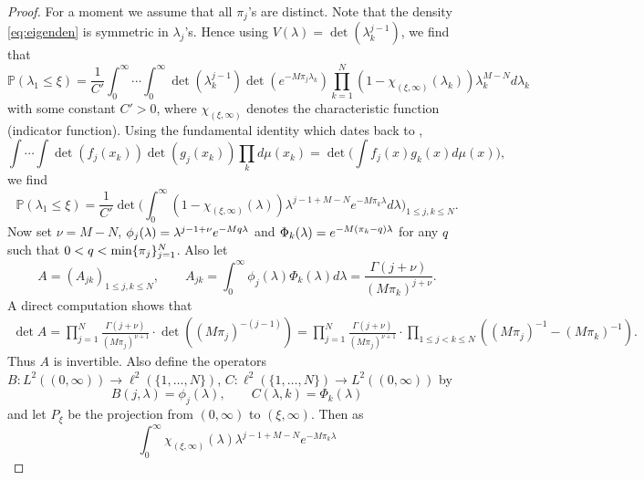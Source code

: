 \documentclass[11pt]{article}
\begin{document}
\begin{proof}
For a moment we assume that all $\pi_j$'s are distinct. Note that
the density \eqref{eq:eigenden} is symmetric in $\lambda_j$'s.
Hence using $V(\lambda)=\det(\lambda_k^{j-1})$, we find that
\begin{equation}
  \mathbb{P}(\lambda_1\le \xi)
  = \frac1{C'} \int_0^\infty \cdots \int_0^\infty
  \det(\lambda_k^{j-1})
  \det(e^{-M\pi_j \lambda_k})  \prod_{k=1}^N
  (1-\chi_{(\xi,\infty)}(\lambda_k))\lambda_k^{M-N} d\lambda_k
\end{equation}
with some constant $C'>0$, where $\chi_{(\xi,\infty)}$ denotes the
characteristic function (indicator function). Using the
fundamental identity which dates back to \cite{Andreief},
\begin{equation}
  \int\cdots \int \det(f_j(x_k)) \det(g_j(x_k)) \prod_k d\mu(x_k)
  = \det \biggl( \int f_j(x)g_k(x) d\mu(x) \biggr),
\end{equation}
we find
\begin{equation}
  \mathbb{P} (\lambda_1\le \xi)
  = \frac1{C'} \det \biggl(
  \int_0^\infty (1-\chi_{(\xi,\infty)}(\lambda)) \lambda^{j-1+M-N} e^{-M\pi_k \lambda}
  d\lambda
  \biggr)_{1\le j,k\le N} .
\end{equation}
Now set $\nu=M-N$,
$\phi_j(\lambda)=\lambda^{j-1+\nu}e^{-Mq\lambda}$ and
$\Phi_k(\lambda)=e^{-M(\pi_k-q) \lambda}$ for any $q$
such that $0<q<\min\{\pi_j\}_{j=1}^N$. Also let
\begin{equation}
  A=(A_{jk})_{1\le j,k\le N}, \qquad A_{jk} = \int_0^{\infty} \phi_j(\lambda)
  \Phi_k(\lambda)
  d\lambda
  = \frac{\Gamma(j+\nu)}{(M\pi_k)^{j+\nu}}.
\end{equation}
A direct computation shows that
\begin{eqnarray}\label{eq:detA}
 \det A
 = \prod_{j=1}^N \frac{\Gamma(j+\nu)}{(M\pi_j)^{\nu+1}}
 \cdot \det((M\pi_j)^{-(j-1)})
 = \prod_{j=1}^N \frac{\Gamma(j+\nu)}{(M\pi_j)^{\nu+1}}
 \cdot \prod_{1\le j<k\le N} ((M\pi_j)^{-1}-(M\pi_k)^{-1}).
\end{eqnarray}
Thus $A$ is invertible. Also define the operators
$B:L^2((0,\infty))\to \ell^2(\{1,\dots, N\})$, $C:
\ell^2(\{1,\dots, N\}) \to L^2((0,\infty))$ by
\begin{equation}
  B(j,\lambda) = \phi_j(\lambda), \qquad C(\lambda, k) =
  \Phi_k(\lambda)
\end{equation}
and let $P_\xi$ be the projection from $(0,\infty)$ to
$(\xi,\infty)$. Then as
\begin{equation}
  \int_0^\infty \chi_{(\xi,\infty)}(\lambda) \lambda^{j-1+M-N} e^{-M\pi_k \lambda}

\end{equation}
\end{proof}
\end{document}
